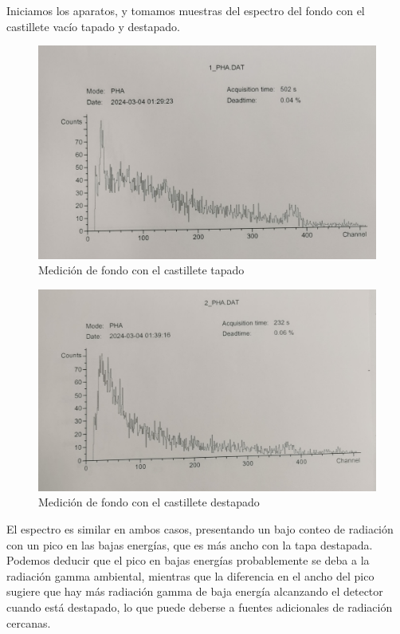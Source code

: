 \documentclass[a4paper,12pt,spanish]{article}
\begin{document}
	Iniciamos los aparatos, y tomamos muestras del espectro del fondo con el castillete vacío tapado y destapado.
	
	
\begin{figure}[H]
	\centering
	\includegraphics[width=0.7\linewidth]{../graficas_procesadas/PHA_1}
	\caption{Medición de fondo con el castillete tapado}
	\label{fig:pha1}
\end{figure}
	
	
\begin{figure}[H]
	\centering
	\includegraphics[width=0.7\linewidth]{../graficas_procesadas/PHA_2}
	\caption{Medición de fondo con el castillete destapado}
	\label{fig:pha2}
\end{figure}



 
 
 El espectro es similar en ambos casos, presentando un bajo conteo de radiación con un pico en las bajas energías, que es más ancho con la tapa destapada. Podemos deducir que el pico en bajas energías probablemente se deba a la radiación gamma ambiental, mientras que la diferencia en el ancho del pico sugiere que hay más radiación gamma de baja energía alcanzando el detector cuando está destapado, lo que puede deberse a fuentes adicionales de radiación cercanas.
 
\end{document}
